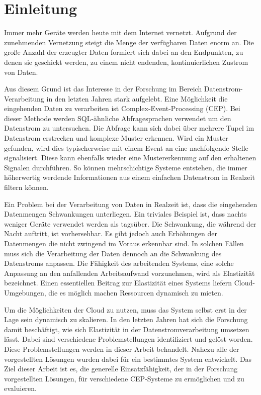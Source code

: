 
\chapter{Einleitung}

Immer mehr Geräte werden heute mit dem Internet vernetzt.
Aufgrund der zunehmenden Vernetzung steigt die Menge der verfügbaren Daten enorm an.
Die große Anzahl der erzeugter Daten formiert sich dabei an den Endpunkten, zu denen sie geschickt werden, zu einem nicht endenden, kontinuierlichen Zustrom von Daten.

Aus diesem Grund ist das Interesse in der Forschung im Bereich Datenstrom-Verarbeitung in den letzten Jahren stark aufgelebt.
Eine Möglichkeit die eingehenden Daten zu verarbeiten ist Complex-Event-Processing (CEP).
Bei dieser Methode werden SQL-ähnliche Abfragesprachen verwendet um den Datenstrom zu untersuchen.
Die Abfrage kann sich dabei über mehrere Tupel im Datenstrom erstrecken und komplexe Muster erkennen.
Wird ein Muster gefunden, wird dies typischerweise mit einem Event an eine nachfolgende Stelle signalisiert.
Diese kann ebenfalls wieder eine Mustererkennung auf den erhaltenen Signalen durchführen.
So können mehrschichtige Systeme entstehen, die immer höherwertig werdende Informationen aus einem einfachen Datenstrom in Realzeit filtern können.

Ein Problem bei der Verarbeitung von Daten in Realzeit ist, dass die eingehenden Datenmengen Schwankungen unterliegen.
Ein triviales Beispiel ist, dass nachts weniger Geräte verwendet werden als tagsüber.
Die Schwankung, die während der Nacht auftritt, ist vorhersehbar.
Es gibt jedoch auch Erhöhungen der Datenmengen die nicht zwingend im Voraus erkennbar sind.
In solchen Fällen muss sich die Verarbeitung der Daten dennoch an die Schwankung des Datenstroms anpassen.
Die Fähigkeit des arbeitenden Systems, eine solche Anpassung an den anfallenden Arbeitsaufwand vorzunehmen, wird als Elastizität bezeichnet.
Einen essentiellen Beitrag zur Elastizität eines Systems liefern Cloud-Umgebungen, die es möglich machen Ressourcen dynamisch zu mieten.

Um die Möglichkeiten der Cloud zu nutzen, muss das System selbst erst in der Lage sein dynamisch zu skalieren.
In den letzten Jahren hat sich die Forschung damit beschäftigt, wie sich Elastizität in der Datenstromverarbeitung umsetzen lässt.
Dabei sind verschiedene Problemstellungen identifiziert und gelöst worden.
Diese Problemstellungen werden in dieser Arbeit behandelt.
Nahezu alle der vorgestellten Lösungen wurden dabei für ein bestimmtes System entwickelt.
Das Ziel dieser Arbeit ist es, die generelle Einsatzfähigkeit, der in der Forschung vorgestellten Lösungen, für verschiedene CEP-Systeme zu ermöglichen und zu evaluieren.

